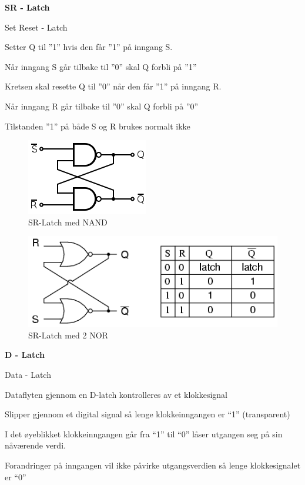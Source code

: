 \documentclass{article}
\begin{document}
	\textbf{SR - Latch}
	
	Set Reset - Latch
	
	Setter Q  til ”1”  hvis den får ”1”  på inngang S. 
	
	Når inngang S går tilbake til ”0” skal Q forbli på ”1”
		
	Kretsen skal resette Q  til ”0”  når den får ”1”  på inngang R.
	
	Når inngang R går tilbake til ”0”  skal Q  forbli på ”0”
	
	Tilstanden ”1”  på både S  og R  brukes	normalt ikke
	
	\begin{figure}[H]
		\includegraphics[scale = 0.6]{srlatch.png}
		\caption{SR-Latch med NAND}
	\end{figure}
	
	\begin{figure}[H]
		\includegraphics[scale = 0.6]{srL.png}
		\caption{SR-Latch med 2 NOR}
	\end{figure}
	
	\textbf{D - Latch}
	
	Data - Latch
		
	Dataflyten gjennom en  D-­latch  kontrolleres av et  klokkesignal
	
	Slipper  gjennom et  digital  signal  så lenge klokkeinngangen er “1” (transparent)
	
	I  det øyeblikket klokkeinngangen går fra “1”  til “0”  låser utgangen seg på sin nåværende verdi.  
	
	Forandringer på	inngangen vil ikke påvirke utgangsverdien så lenge klokkesignalet er “0”
	
\end{document}
